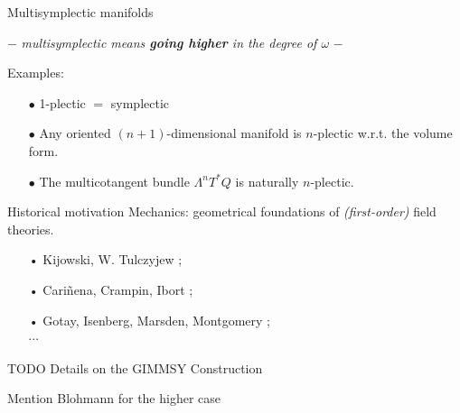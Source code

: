 \documentclass[10pt]{beamer}
\begin{document}
\begin{frame}[t, fragile]{Multisymplectic manifolds} %
	\begin{center}
		$-$ \emph{multisymplectic means \textbf{going higher} in the degree of $\omega$} $-$
	\end{center}
	\pause
	\begin{defblock}
			
	\end{defblock}
	\vfill
	\pause
	\begin{block}{Examples:}
		\begin{itemize}
			\item[$\bullet$] 1-plectic $=$ symplectic
			\item[$\bullet$] Any oriented $(n+1)$-dimensional manifold is $n$-plectic w.r.t. the volume form.
			\item[$\bullet$] The multicotangent bundle $\Lambda^n T^\ast Q$ is naturally $n$-plectic.
		\end{itemize}
	\end{block}			 
%
	\pause
	\begin{block}{Historical motivation}
		Mechanics: geometrical foundations of \textit{(first-order)} field theories.
		\begin{itemize}
		 \item[•] Kijowski, W. Tulczyjew \cite{Kijowski1979}; %
		 \item[•] Cariñena, Crampin, Ibort \cite{Carinena1991b};%
		 \item[•] Gotay, Isenberg, Marsden, Montgomery \cite{Gimmsy1};%
		 \\ $\cdots$
		\end{itemize}
	\end{block}
\end{frame}


\begin{frame}[fragile]{TODO}
	Details on the GIMMSY Construction
	
	Mention Blohmann for the higher case
\end{frame}


\end{document}
